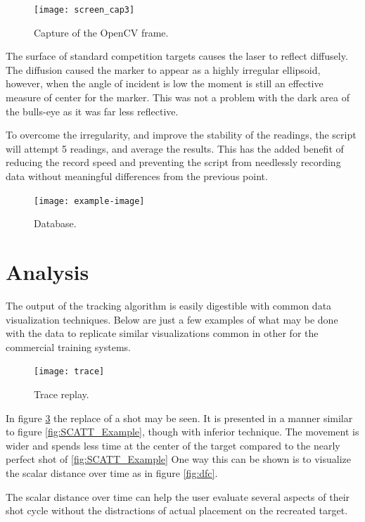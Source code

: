 \documentclass[conference]{IEEEtran}
\begin{document}
\begin{figure}[]
	\centering
	\texttt{[image: screen\_cap3]}
	\caption{Capture of the OpenCV frame.}
	\label{fig:screen_cap}
\end{figure}

The surface of standard competition targets causes the laser to reflect diffusely.
The diffusion caused the marker to appear as a highly irregular ellipsoid,
however, when the angle of incident is low the moment is still an effective measure of center for the marker.
This was not a problem with the dark area of the bulls-eye as it was far less reflective.

To overcome the irregularity, and improve the stability of the readings, the script will attempt 5 readings, and average the results.
This has the added benefit of reducing the record speed and preventing the script from needlessly recording data without meaningful differences from the previous point.


\begin{figure}[]
	\centering
	\texttt{[image: example-image]}
	\caption{Database.}
	\label{fig:database}
\end{figure}

\section{Analysis}

The output of the tracking algorithm is easily digestible with common data visualization techniques.
Below are just a few examples of what may be done with the data to replicate similar visualizations common in other for the commercial training systems.

\begin{figure}[]
	\centering
	\texttt{[image: trace]}
	\caption{Trace replay.}
	\label{fig:trace}
\end{figure}

In figure \ref{fig:trace} the replace of a shot may be seen.
It is presented in a manner similar to figure \ref{fig:SCATT_Example}, 
though with inferior technique.
The movement is wider and spends less time at the center of the target compared to the nearly perfect shot of  \ref{fig:SCATT_Example}
One way this can be shown is to visualize the scalar distance over time as in figure \ref{fig:dfc}.

The scalar distance over time can help the user evaluate several aspects of their shot cycle without the distractions of actual placement on the recreated target.
\end{document}
